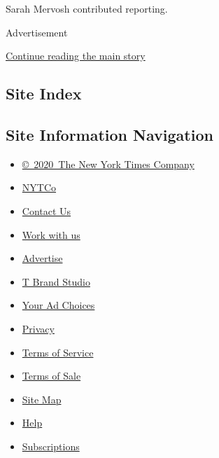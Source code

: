 Sarah Mervosh contributed reporting.

Advertisement

\protect\hyperlink{after-bottom}{Continue reading the main story}

\hypertarget{site-index}{%
\subsection{Site Index}\label{site-index}}

\hypertarget{site-information-navigation}{%
\subsection{Site Information
Navigation}\label{site-information-navigation}}

\begin{itemize}
\tightlist
\item
  \href{https://help.nytimes.com/hc/en-us/articles/115014792127-Copyright-notice}{©~2020~The
  New York Times Company}
\end{itemize}

\begin{itemize}
\tightlist
\item
  \href{https://www.nytco.com/}{NYTCo}
\item
  \href{https://help.nytimes.com/hc/en-us/articles/115015385887-Contact-Us}{Contact
  Us}
\item
  \href{https://www.nytco.com/careers/}{Work with us}
\item
  \href{https://nytmediakit.com/}{Advertise}
\item
  \href{http://www.tbrandstudio.com/}{T Brand Studio}
\item
  \href{https://www.nytimes.com/privacy/cookie-policy\#how-do-i-manage-trackers}{Your
  Ad Choices}
\item
  \href{https://www.nytimes.com/privacy}{Privacy}
\item
  \href{https://help.nytimes.com/hc/en-us/articles/115014893428-Terms-of-service}{Terms
  of Service}
\item
  \href{https://help.nytimes.com/hc/en-us/articles/115014893968-Terms-of-sale}{Terms
  of Sale}
\item
  \href{https://spiderbites.nytimes.com}{Site Map}
\item
  \href{https://help.nytimes.com/hc/en-us}{Help}
\item
  \href{https://www.nytimes.com/subscription?campaignId=37WXW}{Subscriptions}
\end{itemize}
